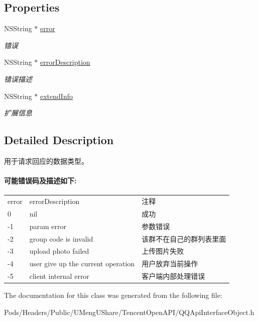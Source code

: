 \subsection*{Properties}
\begin{DoxyCompactItemize}
\item 
\mbox{\label{interface_q_q_api_result_object_a6bf3ae499a2246d1ca0d2f48d3afb5a7}} 
N\+S\+String $\ast$ \mbox{\hyperlink{interface_q_q_api_result_object_a6bf3ae499a2246d1ca0d2f48d3afb5a7}{error}}
\begin{DoxyCompactList}\small\item\em 错误 \end{DoxyCompactList}\item 
\mbox{\label{interface_q_q_api_result_object_a19965c4c2ed8c4a04f2abeb389512507}} 
N\+S\+String $\ast$ \mbox{\hyperlink{interface_q_q_api_result_object_a19965c4c2ed8c4a04f2abeb389512507}{error\+Description}}
\begin{DoxyCompactList}\small\item\em 错误描述 \end{DoxyCompactList}\item 
\mbox{\label{interface_q_q_api_result_object_ac553cd83cdeb0541f11271d0c6f435fc}} 
N\+S\+String $\ast$ \mbox{\hyperlink{interface_q_q_api_result_object_ac553cd83cdeb0541f11271d0c6f435fc}{extend\+Info}}
\begin{DoxyCompactList}\small\item\em 扩展信息 \end{DoxyCompactList}\end{DoxyCompactItemize}


\subsection{Detailed Description}
用于请求回应的数据类型。 

\paragraph*{可能错误码及描述如下\+:}

\tabulinesep=1mm
\begin{longtabu} spread 0pt [c]{*{3}{|X[-1]}|}
\hline
error&error\+Description&注释 \\
0&nil&成功 \\
-\/1&param error&参数错误 \\
-\/2&group code is invalid&该群不在自己的群列表里面 \\
-\/3&upload photo failed&上传图片失败 \\
-\/4&user give up the current operation&用户放弃当前操作 \\
-\/5&client internal error&客户端内部处理错误 \\
\end{longtabu}


The documentation for this class was generated from the following file\+:\begin{DoxyCompactItemize}
\item 
Pods/\+Headers/\+Public/\+U\+Meng\+U\+Share/\+Tencent\+Open\+A\+P\+I/Q\+Q\+Api\+Interface\+Object.\+h\end{DoxyCompactItemize}
